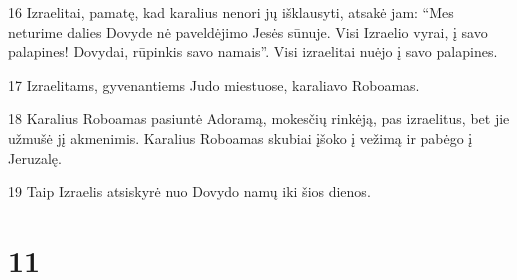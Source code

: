 \par 16 Izraelitai, pamatę, kad karalius nenori jų išklausyti, atsakė jam: “Mes neturime dalies Dovyde nė paveldėjimo Jesės sūnuje. Visi Izraelio vyrai, į savo palapines! Dovydai, rūpinkis savo namais”. Visi izraelitai nuėjo į savo palapines. 
\par 17 Izraelitams, gyvenantiems Judo miestuose, karaliavo Roboamas. 
\par 18 Karalius Roboamas pasiuntė Adoramą, mokesčių rinkėją, pas izraelitus, bet jie užmušė jį akmenimis. Karalius Roboamas skubiai įšoko į vežimą ir pabėgo į Jeruzalę. 
\par 19 Taip Izraelis atsiskyrė nuo Dovydo namų iki šios dienos.



\chapter{11}

